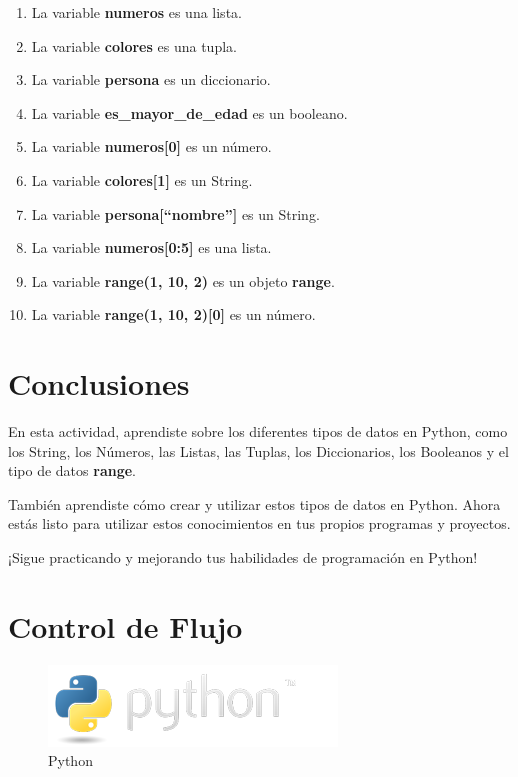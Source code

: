 \documentclass[
  a4paper,
  DIV=11,
  numbers=noendperiod,
  onepage,
  openany]{scrreprt}
\begin{document}
\begin{enumerate}
\def\labelenumi{\arabic{enumi}.}
\item
  La variable \textbf{numeros} es una lista.
\item
  La variable \textbf{colores} es una tupla.
\item
  La variable \textbf{persona} es un diccionario.
\item
  La variable \textbf{es\_mayor\_de\_edad} es un booleano.
\item
  La variable \textbf{numeros{[}0{]}} es un número.
\item
  La variable \textbf{colores{[}1{]}} es un String.
\item
  La variable \textbf{persona{[}``nombre''{]}} es un String.
\item
  La variable \textbf{numeros{[}0:5{]}} es una lista.
\item
  La variable \textbf{range(1, 10, 2)} es un objeto \textbf{range}.
\item
  La variable \textbf{range(1, 10, 2){[}0{]}} es un número.
\end{enumerate}

\chapter{Conclusiones}\label{conclusiones-1}

En esta actividad, aprendiste sobre los diferentes tipos de datos en
Python, como los String, los Números, las Listas, las Tuplas, los
Diccionarios, los Booleanos y el tipo de datos \textbf{range}.

También aprendiste cómo crear y utilizar estos tipos de datos en Python.
Ahora estás listo para utilizar estos conocimientos en tus propios
programas y proyectos.

¡Sigue practicando y mejorando tus habilidades de programación en
Python!

\chapter{Control de Flujo}\label{control-de-flujo}

\begin{figure}[H]

{\centering \includegraphics{index_files/mediabag/python-logo.png}

}

\caption{Python}

\end{figure}%
\end{document}
